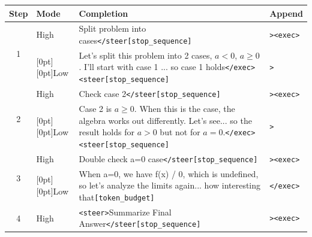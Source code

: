 \documentclass[10pt,twocolumn]{article}
\newcommand{\steertag}[1]{\textcolor{blue!70!black}{\texttt{#1}}}
\newcommand{\exectag}[1]{\textcolor{green!45!black}{\texttt{#1}}}
\newcommand{\budgettag}{\textcolor{red!80!black}{\texttt{[token\_budget]}}}
\newcommand{\stoptag}{\textcolor{red!80!black}{\texttt{[stop\_sequence]}}}
\newcommand{\lowmodelabel}{\raisebox{0.9\baselineskip}[0pt][0pt]{Low}}
\begin{document}
\begin{table}[t]
  \centering
  \small
  {%
    \renewcommand{\tabularxcolumn}[1]{b{#1}}%
    \begin{tabularx}{0.9\textwidth}{@{}c >{\raggedright\arraybackslash}p{} X >{\raggedright\arraybackslash}b{}@{}}
      \toprule
      Step               & Mode          & Completion                                                                                                                                                                                      & Append                       \\
      \midrule
      \multirow{2}{*}{1} & High          & Split problem into cases\steertag{</steer}\stoptag                                                                                                                                              & \steertag{>}\exectag{<exec>} \\
                         & \lowmodelabel & Let's split this problem into 2 cases, \(a < 0\), \(a \geq 0\). I'll start with case 1 ... so case 1 holds\exectag{</exec>}\steertag{<steer}\stoptag                                            & \steertag{>}                 \\
      \midrule
      \multirow{2}{*}{2} & High          & Check case 2\steertag{</steer}\stoptag                                                                                                                                                          & \steertag{>}\exectag{<exec>} \\
                         & \lowmodelabel & Case 2 is \( a \geq 0 \). When this is the case, the algebra works out differently. Let's see... so the result holds for \(a>0\) but not for \(a=0\).\exectag{</exec>}\steertag{<steer}\stoptag & \steertag{>}                 \\
      \midrule
      \multirow{2}{*}{3} & High          & Double check a=0 case\steertag{</steer}\stoptag                                                                                                                                                 & \steertag{>}\exectag{<exec>} \\
                         & \lowmodelabel & When a=0, we have f(x) / 0, which is undefined, so let's analyze the limits again... how interesting that\budgettag                                                                             & \exectag{</exec>}            \\
      \midrule
      \multirow{2}{*}{4} & High          & \steertag{<steer>}Summarize Final Answer\steertag{</steer}\stoptag                                                                                                                              & \steertag{>}\exectag{<exec>} \\

\end{tabularx}}
\end{table}
\end{document}
